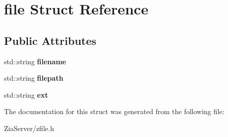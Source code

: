 \hypertarget{structfile}{
\section{file Struct Reference}
\label{structfile}
}
\subsection*{Public Attributes}
\begin{DoxyCompactItemize}
\item 
\hypertarget{structfile_a4714478b17f2b5a3a8bc869a259f27f8}{
std::string {\bfseries filename}}
\label{structfile_a4714478b17f2b5a3a8bc869a259f27f8}

\item 
\hypertarget{structfile_ac5e7f0443a85241e529105097fe17924}{
std::string {\bfseries filepath}}
\label{structfile_ac5e7f0443a85241e529105097fe17924}

\item 
\hypertarget{structfile_a61d9c58c5cfb4e0ae94c57686509bb37}{
std::string {\bfseries ext}}
\label{structfile_a61d9c58c5cfb4e0ae94c57686509bb37}

\end{DoxyCompactItemize}


The documentation for this struct was generated from the following file:\begin{DoxyCompactItemize}
\item 
ZiaServer/zfile.h\end{DoxyCompactItemize}
